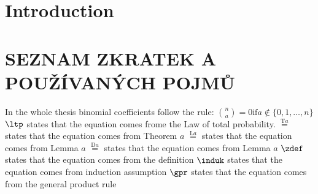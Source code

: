 \chapter*{Introduction}
\chapter*{SEZNAM ZKRATEK A POUŽÍVANÝCH POJMŮ}
In the whole thesis binomial coefficients follow the rule: $\binom{n}{a}=0 \text{if} a\not\in \{0,1,\ldots, n\}$
$\ltp$ states that the equation comes frome the Law of total probability.
$\overset{\text{T}a}{=}$ states that the equation comes from Theorem $a$
$\overset{\text{L}a}{=}$ states that the equation comes from Lemma $a$
$\overset{\text{D}a}{=}$ states that the equation comes from Lemma $a$
$\zdef$ states that the equation comes from the definition
$\induk$ states that the equation comes from induction assumption
$\gpr$ states that the equation comes from the general product rule
